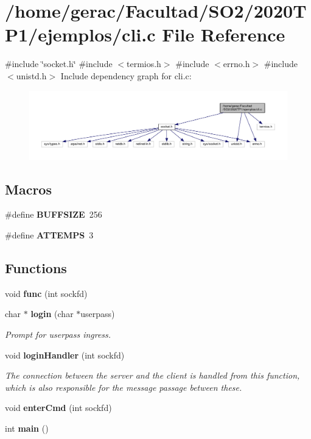 \section{/home/gerac/\+Facultad/\+S\+O2/2020\+T\+P1/ejemplos/cli.c File Reference}
\label{cli_8c}
{\ttfamily \#include \char`\"{}socket.\+h\char`\"{}}\newline
{\ttfamily \#include $<$termios.\+h$>$}\newline
{\ttfamily \#include $<$errno.\+h$>$}\newline
{\ttfamily \#include $<$unistd.\+h$>$}\newline
Include dependency graph for cli.\+c\+:\nopagebreak
\begin{figure}[H]
\begin{center}
\leavevmode
\includegraphics[width=350pt]{cli_8c__incl}
\end{center}
\end{figure}
\subsection*{Macros}
\begin{DoxyCompactItemize}
\item 
\#define \textbf{ B\+U\+F\+F\+S\+I\+ZE}~256
\item 
\#define \textbf{ A\+T\+T\+E\+M\+PS}~3
\end{DoxyCompactItemize}
\subsection*{Functions}
\begin{DoxyCompactItemize}
\item 
void \textbf{ func} (int sockfd)
\item 
char $\ast$ \textbf{ login} (char $\ast$userpass)
\begin{DoxyCompactList}\small\item\em Prompt for userpass ingress. \end{DoxyCompactList}\item 
void \textbf{ login\+Handler} (int sockfd)
\begin{DoxyCompactList}\small\item\em The connection between the server and the client is handled from this function, which is also responsible for the message passage between these. \end{DoxyCompactList}\item 
void \textbf{ enter\+Cmd} (int sockfd)
\item 
int \textbf{ main} ()
\end{DoxyCompactItemize}


